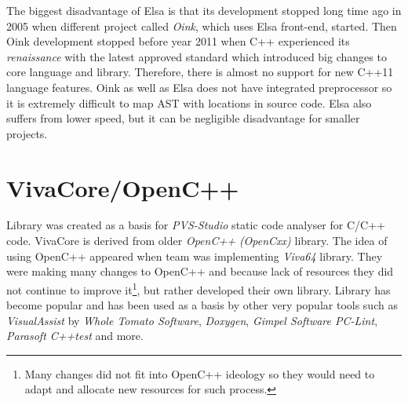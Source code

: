 The biggest disadvantage of Elsa is that its development stopped long time ago in 2005 when different project called \emph{Oink}, which uses Elsa front-end, started. Then Oink development stopped before year 2011 when C++ experienced its \textit{renaissance} with the latest approved standard which introduced big changes to core language and library. Therefore, there is almost no support for new C++11 language features. Oink as well as Elsa does not have integrated preprocessor so it is extremely difficult to map AST with locations in source code. Elsa also suffers from lower speed, but it can be negligible disadvantage for smaller projects.

\section{VivaCore/OpenC++}
Library was created as a basis for \emph{PVS-Studio} static code analyser for C/C++ code. VivaCore is derived from older \emph{OpenC++ (OpenCxx)} library. The idea of using OpenC++ appeared when team was implementing \emph{Viva64} library. They were making many changes to OpenC++ and because lack of resources they did not continue to improve it\footnote{Many changes did not fit into OpenC++ ideology so they would need to adapt and allocate new resources for such process.}, but rather developed their own library. Library has become popular and has been used as a basis by other very popular tools such as  \emph{VisualAssist} by \emph{Whole Tomato Software}, \emph{Doxygen}, \emph{Gimpel Software PC-Lint}, \emph{Parasoft C++test} and more.

